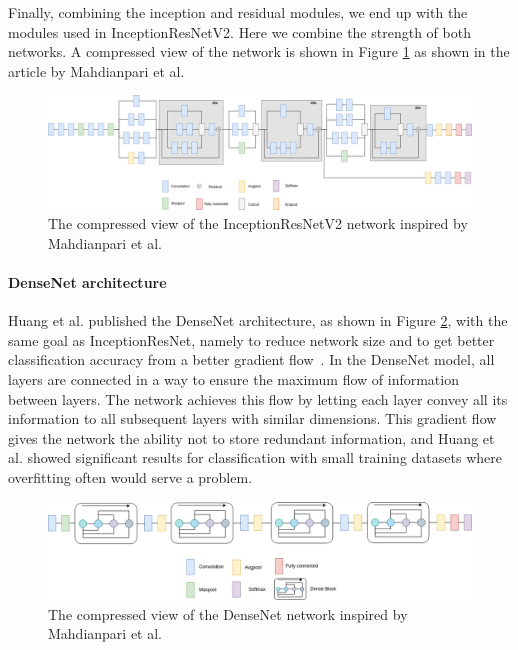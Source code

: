Finally, combining the inception and residual modules, we end up with the modules used in InceptionResNetV2. 
Here we combine the strength of both networks. A compressed view of the network is shown in Figure \ref{fig:IRV2} as shown in the article by Mahdianpari et al.~\cite{rs10071119}
\begin{figure}[h]
     \centering
     \includegraphics[width=1\textwidth]{methodology/figures/Schematic-diagram-of-InceptionResNetV2.png}
     \caption{The compressed view of the InceptionResNetV2 network inspired by Mahdianpari et al.}
     \label{fig:IRV2}
\end{figure}

\paragraph{DenseNet architecture}
Huang et al. published the DenseNet architecture, as shown in Figure \ref{fig:DN}, with the same goal as InceptionResNet, namely to reduce network size and to get better classification accuracy from a better gradient flow~\cite{Huang_2017}.
In the DenseNet model, all layers are connected in a way to ensure the maximum flow of information between layers. The network achieves this flow by letting each layer convey all its information to all subsequent layers with similar dimensions. This gradient flow gives the network the ability not to store redundant information, and Huang et al. showed significant results for classification with small training datasets where overfitting often would serve a problem.

\begin{figure}[h]
     \centering
     \includegraphics[width=1\textwidth]{methodology/figures/Schematic-diagram-of-DenseNet-model.png}
     \caption{The compressed view of the DenseNet network inspired by Mahdianpari et al.}
     \label{fig:DN}
\end{figure}

